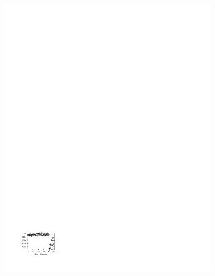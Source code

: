 \begin{figure}[t]
\begin{center}
{            \includegraphics[trim=2cm 2cm 16.3cm 24cm]{Figures/holistic/skew_predicates}
        }%
      \subfloat[Periodic]{%
           \label{fig:periodic_pred}
}
\end{center}
\end{figure}
